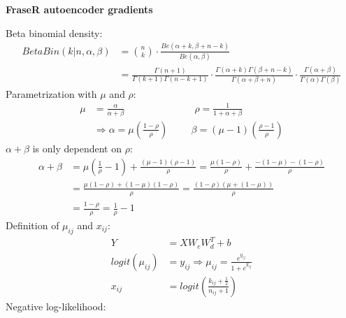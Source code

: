 \documentclass[12pt,a4paper]{article}
\author{Ines Scheller}
\begin{document}
\begin{center}{\textbf{FraseR autoencoder gradients}}\end{center} 
Beta binomial density:
\begin{align*}
BetaBin(k | n, \alpha, \beta) &= \binom{n}{k} \cdot \frac{Be(\alpha + k, \beta + n -k)}{Be(\alpha, \beta)} \\
&= \frac{\Gamma(n+1)}{\Gamma(k+1)\Gamma(n-k+1)} \cdot \frac{\Gamma(\alpha + k)\Gamma(\beta + n - k)}{\Gamma(\alpha + \beta + n)} \cdot \frac{\Gamma(\alpha + \beta)}{\Gamma(\alpha)\Gamma(\beta)}
\end{align*}
Parametrization with $\mu$ and $\rho$:
\begin{align*}
\mu &= \frac{\alpha}{\alpha + \beta} \hspace{3cm} \rho = \frac{1}{1 + \alpha + \beta} \\
&\Rightarrow \alpha = \mu \left(\frac{1-\rho}{\rho}\right) \hspace{1cm} \beta = (\mu - 1)\left(\frac{\rho - 1}{\rho}\right)
\end{align*}
$\alpha + \beta$ is only dependent on $\rho$:
\begin{align*}
\alpha + \beta &= \mu (\frac{1}{\rho} - 1) + \frac{(\mu - 1)(\rho - 1)}{\rho} = \frac{\mu(1-\rho)}{\rho} + \frac{-(1-\mu)-(1-\rho)}{\rho} \\
&= \frac{\mu(1-\rho) + (1-\mu)(1-\rho)}{\rho} = \frac{(1-\rho)\left(\mu + (1 - \mu)\right)}{\rho} \\
&= \frac{1-\rho}{\rho} = \frac{1}{\rho} - 1
\end{align*}
Definition of $\mu_{ij}$ and $x_{ij}$:
\begin{align*}
Y &= XW_eW_d^T + b \\
logit(\mu_{ij}) &= y_{ij} \Rightarrow \mu_{ij} = \frac{e^{y_{ij}}}{1+e^{y_{ij}}} \\
x_{ij} &= logit\left(\frac{k_{ij} + \frac{1}{2}}{n_{ij}+1} \right)
\end{align*}
Negative log-likelihood:
\end{document}
